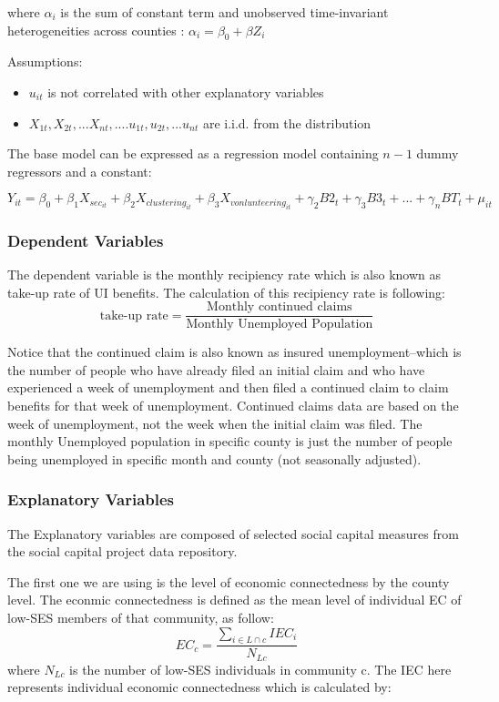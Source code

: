 \documentclass{article}
\begin{document}
where $\alpha_i$ is the sum of constant term and unobserved time-invariant heterogeneities across counties : $\alpha_i=\beta_0+\beta Z_i$

Assumptions:
\begin{itemize}
    \item  $u_{it}$ is not correlated with other explanatory variables
    \item $X_{1t}, X_{2t}, ... X_{nt}, ....u_{1t}, u_{2t}, ...u_{nt}$ are i.i.d. from the distribution
\end{itemize}

The base model can be expressed as a regression model containing $n-1$ dummy regressors and a constant:

$Y_{it}=\beta_0+\beta_1 X_{sec_{it}}+\beta_2 X_{clustering_{it}}+\beta_3 X_{vonlunteering_{it}}+\gamma_2 B2_t+\gamma_3 B3_t +...+\gamma_n BT_t+\mu_{it}$

\subsubsection{Dependent Variables}

The dependent variable is the monthly recipiency rate which is also known as take-up rate of UI benefits. The calculation of this recipiency rate is following: $$\text{take-up rate}=\frac{\text{Monthly continued claims}}{\text{Monthly Unemployed Population}}$$

Notice that the continued claim is also known as insured unemployment--which is the number of people who have already filed an initial claim and who have experienced a week of unemployment and then filed a continued claim to claim benefits for that week of unemployment. Continued claims data are based on the week of unemployment, not the week when the initial claim was filed. The monthly Unemployed population in specific county is just the number of people being unemployed in specific month and county (not seasonally adjusted).

\subsubsection{Explanatory Variables}

The Explanatory variables are composed of selected social capital measures from the social capital project data repository.

The first one we are using is the level of economic connectedness by the county level. The econmic connectedness is defined as the mean level of individual EC of low-SES members of that community, as follow: $$EC_c=\frac{\sum_{i\in L \cap c}{IEC_i}}{N_{Lc}}$$ where $N_{Lc}$ is the number of low-SES individuals in community c. The IEC here represents individual economic connectedness which is calculated by:
\end{document}
